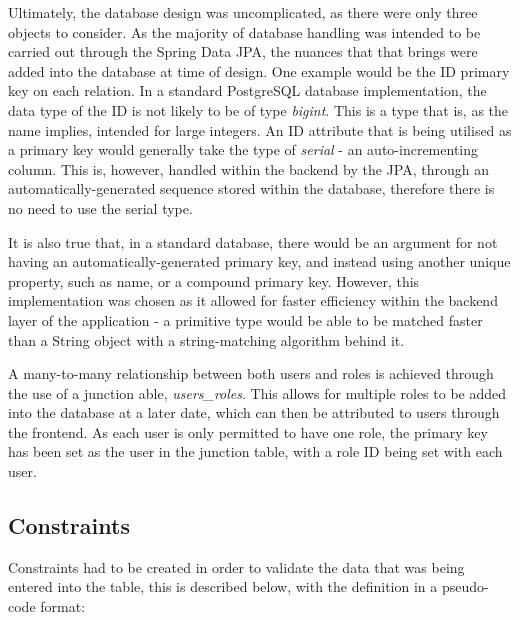 Ultimately, the database design was uncomplicated, as there were only three objects to consider. As the majority of database handling was intended to be carried out through the Spring Data JPA, the nuances that that brings were added into the database at time of design. One example would be the ID primary key on each relation. In a standard PostgreSQL database implementation, the data type of the ID is not likely to be of type \textit{bigint}. This is a type that is, as the name implies, intended for large integers. An ID attribute that is being utilised as a primary key would generally take the type of \textit{serial} - an auto-incrementing column. This is, however, handled within the backend by the JPA, through an automatically-generated sequence stored within the database, therefore there is no need to use the serial type.

It is also true that, in a standard database, there would be an argument for not having an automatically-generated primary key, and instead using another unique property, such as name, or a compound primary key. However, this implementation was chosen as it allowed for faster efficiency within the backend layer of the application - a primitive type would be able to be matched faster than a String object with a string-matching algorithm behind it.

A many-to-many relationship between both users and roles is achieved through the use of a junction able, \textit{users\_roles}. This allows for multiple roles to be added into the database at a later date, which can then be attributed to users through the frontend. As each user is only permitted to have one role, the primary key has been set as the user in the junction table, with a role ID being set with each user.

\subsection{Constraints}

Constraints had to be created in order to validate the data that was being entered into the table, this is described below, with the definition in a pseudo-code format:

